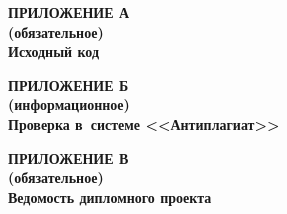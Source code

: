 \begin{center}
\textbf{
\MakeUppercase{Приложение А}\\
(обязательное)\\
Исходный код}
\end{center}



\newpage

\begin{center}
\textbf{
\MakeUppercase{Приложение Б}\\
(информационное)\\
Проверка в~системе <<Антиплагиат>>}
\end{center}

\newpage


\newpage


\begin{center}
\textbf{
\MakeUppercase{Приложение В}\\
(обязательное)\\
Ведомость дипломного проекта}
\end{center}

\newpage
\pagestyle{empty}

\pagestyle{fancy}